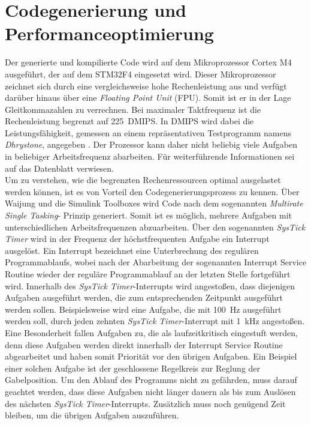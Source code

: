 \section{Codegenerierung und Performanceoptimierung} \label{performanceopt}
Der generierte und kompilierte Code wird auf dem Mikroprozessor Cortex M4 ausgeführt, der auf dem STM32F4 eingesetzt wird. Dieser Mikroprozessor zeichnet sich durch eine vergleichsweise hohe Rechenleistung aus und verfügt darüber hinaus über eine \textit{Floating Point Unit} (FPU). Somit ist er in der Lage Gleitkommazahlen zu verrechnen. Bei maximaler Taktfrequenz ist die Rechenleistung begrenzt auf \SI{225}{DMIPS}. In DMIPS wird dabei die Leistungsfähigkeit, gemessen an einem repräsentativen Testprogramm namens \textit{Dhrystone}, angegeben \cite{https://www.itwissen.info/DMIPS-Dhrystone-MIPS.html}. Der Prozessor kann daher nicht beliebig viele Aufgaben in beliebiger Arbeitsfrequenz abarbeiten. Für weiterführende Informationen sei auf das Datenblatt \cite{stm32} verwiesen.\\
Um zu verstehen, wie die begrenzten Rechenressourcen optimal ausgelastet werden können, ist es von Vorteil den Codegenerierungsprozess zu kennen. Über Waijung und die Simulink Toolboxes wird Code nach dem sogenannten \textit{Multirate Single Tasking}- Prinzip generiert. Somit ist es möglich, mehrere Aufgaben mit unterschiedlichen Arbeitsfrequenzen abzuarbeiten. Über den sogenannten \textit{SysTick Timer} wird in der Frequenz der höchstfrequenten Aufgabe ein Interrupt ausgelöst. Ein Interrupt bezeichnet eine Unterbrechung des regulären Programmablaufs, wobei nach der Abarbeitung der sogenannten Interrupt Service Routine wieder der reguläre Programmablauf an der letzten Stelle fortgeführt wird. 
Innerhalb des \textit{SysTick Timer}-Interrupts wird angestoßen, dass diejenigen Aufgaben ausgeführt werden, die zum entsprechenden Zeitpunkt ausgeführt werden sollen. Beispielsweise wird eine Aufgabe, die mit \SI{100}{Hz} ausgeführt werden soll, durch jeden zehnten \textit{SysTick Timer}-Interrupt mit \SI{1}{kHz} angestoßen. Eine Besonderheit fallen Aufgaben zu, die als laufzeitkritisch eingestuft werden, denn diese Aufgaben werden direkt innerhalb der Interrupt Service Routine abgearbeitet und haben somit Priorität vor den übrigen Aufgaben. Ein Beispiel einer solchen Aufgabe ist der geschlossene Regelkreis zur Reglung der Gabelposition. Um den Ablauf des Programms nicht zu gefährden, muss darauf geachtet werden, dass diese Aufgaben nicht länger dauern als bis zum Auslösen des nächsten \textit{SysTick Timer}-Interrupts. Zusätzlich muss noch genügend Zeit bleiben, um die übrigen Aufgaben auszuführen.\cite{waijung}\\
